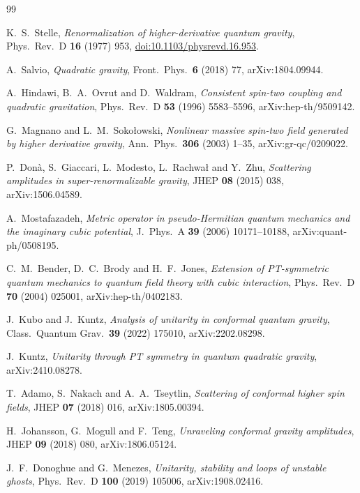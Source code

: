 \documentclass[11pt]{article}
\theoremstyle{definition}
\theoremstyle{remark}
\begin{document}
\begin{thebibliography}{99}

K.~S.~Stelle,
\emph{Renormalization of higher-derivative quantum gravity},
Phys.\ Rev.\ D \textbf{16} (1977) 953,
\href{https://doi.org/10.1103/physrevd.16.953}{doi:10.1103/physrevd.16.953}.

A.~Salvio,
\emph{Quadratic gravity},
Front.\ Phys.\ \textbf{6} (2018) 77,
arXiv:1804.09944.

A.~Hindawi, B.~A.~Ovrut and D.~Waldram,
\emph{Consistent spin-two coupling and quadratic gravitation},
Phys.\ Rev.\ D \textbf{53} (1996) 5583--5596,
arXiv:hep-th/9509142.

G.~Magnano and L.~M.~Soko\l{}owski,
\emph{Nonlinear massive spin-two field generated by higher derivative
gravity},
Ann.\ Phys.\ \textbf{306} (2003) 1--35,
arXiv:gr-qc/0209022.

P.~Don\`a, S.~Giaccari, L.~Modesto, L.~Rachwa\l{} and Y.~Zhu,
\emph{Scattering amplitudes in super-renormalizable gravity},
JHEP \textbf{08} (2015) 038,
arXiv:1506.04589.

A.~Mostafazadeh,
\emph{Metric operator in pseudo-Hermitian quantum mechanics and the
imaginary cubic potential},
J.\ Phys.\ A \textbf{39} (2006) 10171--10188,
arXiv:quant-ph/0508195.

C.~M.~Bender, D.~C.~Brody and H.~F.~Jones,
\emph{Extension of PT-symmetric quantum mechanics to quantum field
theory with cubic interaction},
Phys.\ Rev.\ D \textbf{70} (2004) 025001,
arXiv:hep-th/0402183.

J.~Kubo and J.~Kuntz,
\emph{Analysis of unitarity in conformal quantum gravity},
Class.\ Quantum Grav.\ \textbf{39} (2022) 175010,
arXiv:2202.08298.

J.~Kuntz,
\emph{Unitarity through PT symmetry in quantum quadratic gravity},
arXiv:2410.08278.

T.~Adamo, S.~Nakach and A.~A.~Tseytlin,
\emph{Scattering of conformal higher spin fields},
JHEP \textbf{07} (2018) 016,
arXiv:1805.00394.

H.~Johansson, G.~Mogull and F.~Teng,
\emph{Unraveling conformal gravity amplitudes},
JHEP \textbf{09} (2018) 080,
arXiv:1806.05124.

J.~F.~Donoghue and G.~Menezes,
\emph{Unitarity, stability and loops of unstable ghosts},
Phys.\ Rev.\ D \textbf{100} (2019) 105006,
arXiv:1908.02416.


\end{thebibliography}
\end{document}
